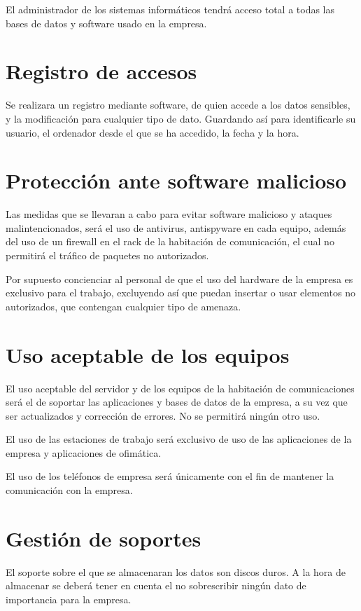 \documentclass[11pt,bibtotoc,noliststotoc,BCOR0mm]{scrbook}
\begin{document}
El administrador de los sistemas informáticos tendrá acceso total a todas las bases de datos y software usado en la empresa.


\section{Registro de accesos}

Se realizara un registro mediante software, de quien accede a los datos sensibles, y la modificación para cualquier tipo de dato. Guardando así para identificarle su usuario, el ordenador desde el que se ha accedido, la fecha y la hora. 

\section{Protección ante software malicioso}

Las medidas que se llevaran a cabo para evitar software malicioso y ataques malintencionados, será el uso de antivirus, antispyware en cada equipo, además del uso de un firewall en el rack de la habitación de comunicación, el cual no permitirá el tráfico de paquetes no autorizados.


Por supuesto concienciar al personal de que el uso del hardware de la empresa es exclusivo para el trabajo, excluyendo así que puedan insertar o usar elementos no autorizados, que contengan cualquier tipo de amenaza. 


\section{Uso aceptable de los equipos}

El uso aceptable del servidor y de los equipos de la habitación de comunicaciones será el de soportar las aplicaciones y bases de datos de la empresa, a su vez que ser actualizados y corrección de errores. No se permitirá ningún otro uso. 


El uso de las estaciones de trabajo será exclusivo de uso de las aplicaciones de la empresa y aplicaciones de ofimática. 


El uso de los teléfonos de empresa será únicamente con el fin de mantener la comunicación con la empresa. 


\section{Gestión de soportes}

El soporte sobre el que se almacenaran los datos son discos duros. A la hora de almacenar se deberá tener en cuenta el no sobrescribir ningún dato de importancia para la empresa. 
\end{document}

